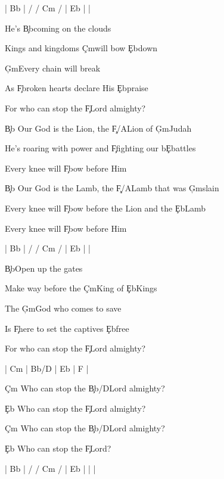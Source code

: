 \documentclass[9pt]{extarticle}
\begin{document}
\bsong

\bi[2]
| Bb |  / / Cm /  | Eb |  |
\ei

\bv
He's \c{Bb}coming on the clouds

Kings and kingdoms \c{Cm}will bow \c{Eb}down

\c{Gm}Every chain will break

As \c{F}broken hearts declare His \c{Eb}praise

For who can stop the \c{F}Lord almighty?
\ev

\bc
\c{Bb} Our God is the Lion, the \c{F/A}Lion of \c{Gm}Judah

He’s roaring with power and \c{F}fighting our b\c{Eb}attles

Every knee will \c{F}bow before Him

\c{Bb} Our God is the Lamb, the \c{F/A}Lamb that was \c{Gm}slain


Every knee will \c{F}bow before the Lion and the \c{Eb}Lamb

Every knee will \c{F}bow before Him
\ec

\bin[2]
| Bb |  / / Cm /  | Eb |  |
\ein

\bv
\c{Bb}Open up the gates

Make way before the \c{Cm}King of \c{Eb}Kings

The \c{Gm}God who comes to save

Is \c{F}here to set the captives \c{Eb}free

For who can stop the \c{F}Lord almighty?
\ev


\bin
| Cm |  Bb/D  | Eb | F |
\ein

\bb[3]
\c{Cm} Who can stop the \c{Bb/D}Lord almighty?

\c{Eb} Who can stop the \c{F}Lord almighty?
\eb

\bb
\c{Cm} Who can stop the \c{Bb/D}Lord almighty?

\c{Eb} Who can stop the \c{F}Lord?
\eb


\bo[2]
| Bb |  / / Cm /  | Eb |  |  |
\eo

\esong
\end{document}
